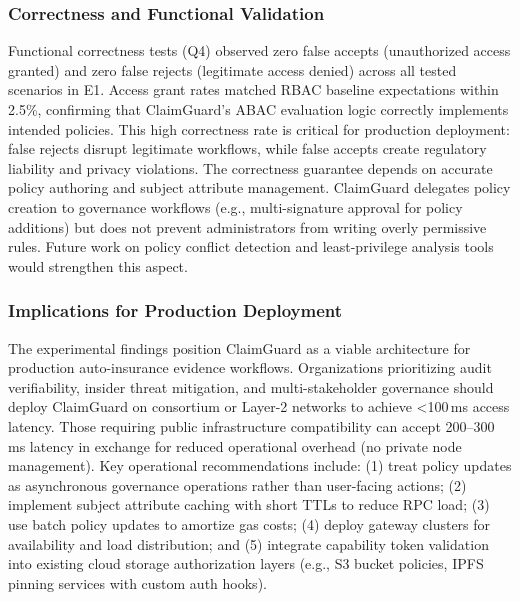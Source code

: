 \documentclass[final,5p,times,twocolumn]{elsarticle}
\begin{document}
\subsubsection{Correctness and Functional Validation}

Functional correctness tests (Q4) observed zero false accepts (unauthorized access granted) and zero false rejects (legitimate access denied) across all tested scenarios in E1. Access grant rates matched RBAC baseline expectations within 2.5\%, confirming that ClaimGuard's ABAC evaluation logic correctly implements intended policies. This high correctness rate is critical for production deployment: false rejects disrupt legitimate workflows, while false accepts create regulatory liability and privacy violations. The correctness guarantee depends on accurate policy authoring and subject attribute management. ClaimGuard delegates policy creation to governance workflows (e.g., multi-signature approval for policy additions) but does not prevent administrators from writing overly permissive rules. Future work on policy conflict detection and least-privilege analysis tools would strengthen this aspect.

\subsubsection{Implications for Production Deployment}

The experimental findings position ClaimGuard as a viable architecture for production auto-insurance evidence workflows. Organizations prioritizing audit verifiability, insider threat mitigation, and multi-stakeholder governance should deploy ClaimGuard on consortium or Layer-2 networks to achieve <100\,ms access latency. Those requiring public infrastructure compatibility can accept 200--300\,ms latency in exchange for reduced operational overhead (no private node management). Key operational recommendations include: (1) treat policy updates as asynchronous governance operations rather than user-facing actions; (2) implement subject attribute caching with short TTLs to reduce RPC load; (3) use batch policy updates to amortize gas costs; (4) deploy gateway clusters for availability and load distribution; and (5) integrate capability token validation into existing cloud storage authorization layers (e.g., S3 bucket policies, IPFS pinning services with custom auth hooks).
\end{document}
